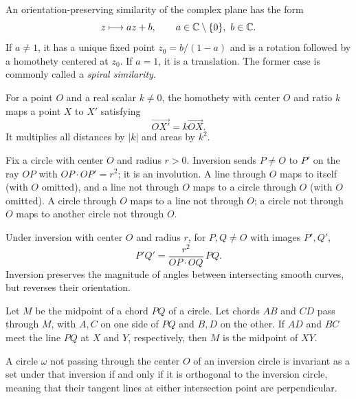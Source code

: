 \begin{definition}
An orientation-preserving similarity of the complex plane has the form
\[
 z\longmapsto az+b, \qquad a\in\mathbb{C}\setminus\{0\}, \ b\in\mathbb{C}.
\]
If $a\ne1$, it has a unique fixed point $z_0=b/(1-a)$ and is a rotation followed by a homothety centered at $z_0$. If $a=1$, it is a translation. The former case is commonly called a \emph{spiral similarity}.
\end{definition}

\begin{definition}[Homothety]
For a point $O$ and a real scalar $k\ne0$, the homothety with center $O$ and ratio $k$ maps a point $X$ to $X'$ satisfying
\[
 \overrightarrow{OX'}=k\overrightarrow{OX}.
\]
It multiplies all distances by $|k|$ and areas by $k^2$.
\end{definition}

\begin{definition}
Fix a circle with center $O$ and radius $r>0$. Inversion sends $P\ne O$ to $P'$ on the ray $OP$ with $OP\cdot OP'=r^2$; it is an involution. A line through $O$ maps to itself (with $O$ omitted), and a line not through $O$ maps to a circle through $O$ (with $O$ omitted). A circle through $O$ maps to a line not through $O$; a circle not through $O$ maps to another circle not through $O$.
\end{definition}

\begin{proposition}
Under inversion with center $O$ and radius $r$, for $P, Q\ne O$ with images $P', Q'$,
\[
 P'Q'=\frac{r^2}{OP\cdot OQ}\, PQ.
\]
Inversion preserves the magnitude of angles between intersecting smooth curves, but reverses their orientation.
\end{proposition}

\begin{theorem}
Let $M$ be the midpoint of a chord $PQ$ of a circle. Let chords $AB$ and $CD$ pass through $M$, with $A, C$ on one side of $PQ$ and $B, D$ on the other. If $AD$ and $BC$ meet the line $PQ$ at $X$ and $Y$, respectively, then $M$ is the midpoint of $XY$.
\end{theorem}

\begin{proposition}
A circle $\omega$ not passing through the center $O$ of an inversion circle is invariant as a set under that inversion if and only if it is orthogonal to the inversion circle, meaning that their tangent lines at either intersection point are perpendicular.
\end{proposition}

